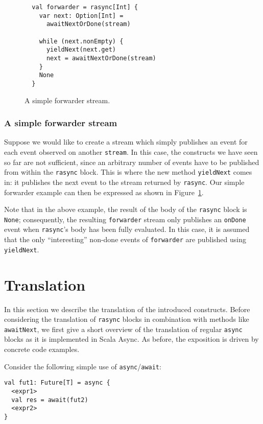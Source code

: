 \documentclass{acm_proc_article-sp}
\begin{document}
\begin{figure}[ht!]
  \centering
  \begin{lstlisting}
  val forwarder = rasync[Int] {
    var next: Option[Int] =
      awaitNextOrDone(stream)

    while (next.nonEmpty) {
      yieldNext(next.get)
      next = awaitNextOrDone(stream)
    }
    None
  }
  \end{lstlisting}
  \caption{A simple forwarder stream.}
  \label{fig:forwarder}
\end{figure}

\subsubsection{A simple forwarder stream}

Suppose we would like to create a stream which simply publishes an event for
each event observed on another \verb|stream|. In this case, the constructs we
have seen so far are not sufficient, since an arbitrary number of events have
to be published from within the \verb|rasync| block. This is where the new
method \verb|yieldNext| comes in: it publishes the next event to the stream
returned by \verb|rasync|. Our simple forwarder example can then be expressed
as shown in Figure~\ref{fig:forwarder}.

Note that in the above example, the result of the body of the \verb|rasync|
block is \verb|None|; consequently, the resulting \verb|forwarder| stream only
publishes an \verb|onDone| event when \verb|rasync|'s body has been fully
evaluated. In this case, it is assumed that the only ``interesting'' non-done
events of \verb|forwarder| are published using \verb|yieldNext|.

\section{Translation}\label{sec:translation}

In this section we describe the translation of the introduced constructs.
Before considering the translation of \verb|rasync| blocks in combination with
methods like \verb|awaitNext|, we first give a short overview of the
translation of regular \verb|async| blocks as it is implemented in Scala
Async. As before, the exposition is driven by concrete code examples.

Consider the following simple use of \verb|async|/\verb|await|:

\begin{lstlisting}
val fut1: Future[T] = async {
  <expr1>
  val res = await(fut2)
  <expr2>
}
\end{lstlisting}
\end{document}
